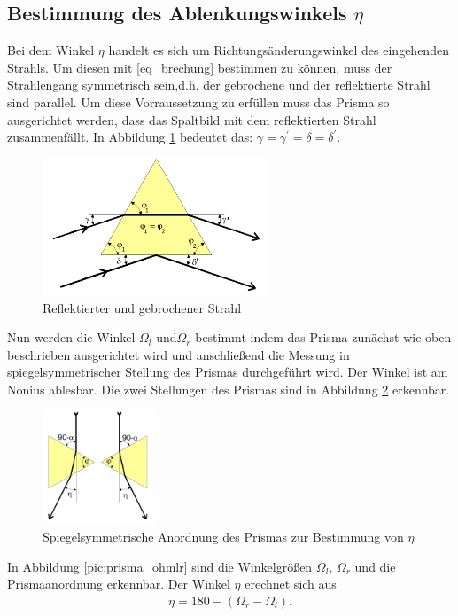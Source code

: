 \subsection{Bestimmung des Ablenkungswinkels $\eta$}	
Bei dem Winkel $\eta$ handelt es sich um Richtungsänderungswinkel des eingehenden Strahls. Um diesen mit \eqref{eq_brechung} bestimmen 
zu können, muss der Strahlengang symmetrisch sein,d.h. der gebrochene und der reflektierte Strahl sind parallel. Um diese Vorraussetzung 
zu erfüllen muss das Prisma so ausgerichtet werden, dass das Spaltbild mit dem reflektierten Strahl zusammenfällt. In Abbildung 
\ref{pic_prismaeta} bedeutet das: $\gamma=\gamma^{\prime}=\delta=\delta^{\prime}$.
\begin{figure}[H]
\includegraphics[width=0.6\textwidth]{pics/prisma_eta.png}
\caption{Reflektierter und gebrochener Strahl}
\label{pic_prismaeta}
\end{figure}
Nun werden die Winkel $\Omega_l$ und$\Omega _r$ bestimmt indem das Prisma zunächst wie oben beschrieben ausgerichtet wird und anschließend die Messung in spiegelsymmetrischer Stellung des Prismas durchgeführt wird. Der Winkel ist am Nonius ablesbar.
Die zwei Stellungen des Prismas sind in Abbildung \ref{pic:prisma_etasym} erkennbar.
\begin{figure}[H]
\includegraphics[width=0.3\textwidth]{pics/prisma_ohm.png}
\caption{Spiegelsymmetrische Anordnung des Prismas zur Bestimmung von $\eta$}
\label{pic:prisma_etasym}
\end{figure}
In Abbildung \ref{pic:prisma_ohmlr} sind die Winkelgrößen $\Omega_l$, $\Omega_r$ und die Prismaanordnung erkennbar. 
Der Winkel $\eta$ erechnet sich aus
\begin{align}
\eta = 180 -(\Omega_r-\Omega_l).
\label{eq:eta_ohm_rl}
\end{align}
	
